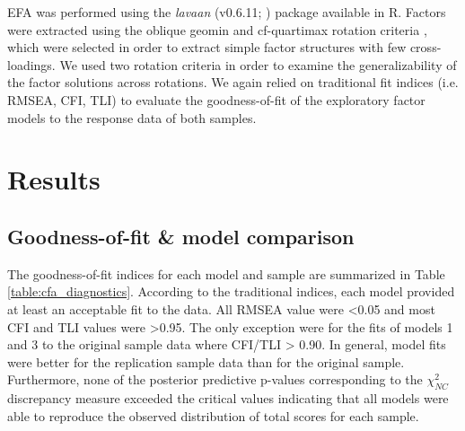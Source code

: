\documentclass[letterpaper,man,natbib,floatsintext,longtable]{apa6}
\begin{document}
EFA was performed using the \textit{lavaan} (v0.6.11; \citealt{lavaan}) package available in R. Factors were extracted using the oblique geomin \citep{yates1987multivariate} and cf-quartimax rotation criteria \citep{crawford1970general}, which were selected in order to extract simple factor structures with few cross-loadings. We used two rotation criteria in order to examine the generalizability of the factor solutions across rotations. We again relied on traditional fit indices (i.e. RMSEA, CFI, TLI) to evaluate the goodness-of-fit of the exploratory factor models to the response data of both samples.

\section{Results}

\subsection{Goodness-of-fit \& model comparison}

The goodness-of-fit indices for each model and sample are summarized in Table \ref{table:cfa_diagnostics}. According to the traditional indices, each model provided at least an acceptable fit to the data. All RMSEA value were <0.05 and most CFI and TLI values were >0.95. The only exception were for the fits of models 1 and 3 to the original sample data where CFI/TLI > 0.90. In general, model fits were better for the replication sample data than for the original sample. Furthermore, none of the posterior predictive p-values corresponding to the $\chi^2_{NC}$ discrepancy measure exceeded the critical values indicating that all models were able to reproduce the observed distribution of total scores for each sample.
\end{document}
